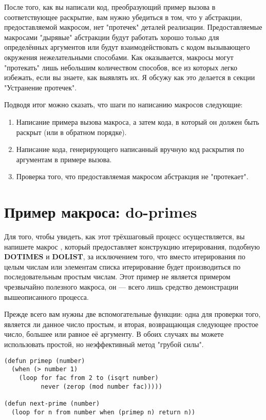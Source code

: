 После того, как вы написали код, преобразующий пример вызова в соответствующее раскрытие,
вам нужно убедиться в том, что у абстракции, предоставляемой макросом, нет "протечек"
деталей реализации. Предоставляемые макросами "дырявые" абстракции будут работать хорошо
только для определённых аргументов или будут взаимодействовать с кодом вызывающего
окружения нежелательными способами. Как оказывается, макросы могут "протекать" лишь
небольшим количеством способов, все из которых легко избежать, если вы знаете, как
выявлять их. Я обсужу как это делается в секции "Устранение протечек".

Подводя итог можно сказать, что шаги по написанию макросов следующие:

\begin{enumerate}
\item Написание примера вызова макроса, а затем кода, в который он должен быть раскрыт
  (или в обратном порядке).
  
\item Написание кода, генерирующего написанный вручную код раскрытия по аргументам в
  примере вызова.

\item Проверка того, что предоставляемая макросом абстракция не "протекает".
\end{enumerate}

\section{Пример макроса: do-primes}

Для того, чтобы увидеть, как этот трёхшаговый процесс осуществляется, вы напишете макрос
, который предоставляет конструкцию итерирования, подобную
\textbf{DOTIMES} и \textbf{DOLIST}, за исключением того, что вместо итерирования по целым
числам или элементам списка итерирование будет производиться по последовательным простым
числам. Этот пример не является примером чрезвычайно полезного макроса, он --- всего лишь
средство демонстрации вышеописанного процесса.

Прежде всего вам нужны две вспомогательные функции: одна для проверки того, является ли
данное число простым, и вторая, возвращающая следующее простое число, большее или равное
её аргументу. В обоих случаях вы можете использовать простой, но неэффективный метод
"грубой силы".

\begin{lstlisting}
(defun primep (number)
  (when (> number 1)
    (loop for fac from 2 to (isqrt number) 
          never (zerop (mod number fac)))))

(defun next-prime (number)
  (loop for n from number when (primep n) return n))
\end{lstlisting}

